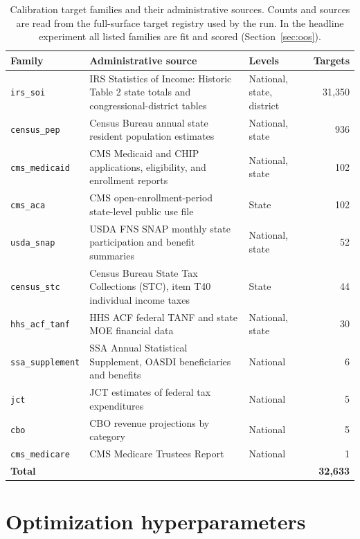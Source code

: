 \begin{table}[H]
\centering
{\tablefont
\begin{tabular}{@{}p{}p{}p{}r@{}}
\toprule
Family & Administrative source & Levels & Targets \\
\midrule
\texttt{irs\_soi} & IRS Statistics of Income: Historic Table 2 state totals and congressional-district tables & National, state, district & 31{,}350 \\
\texttt{census\_pep} & Census Bureau annual state resident population estimates & National, state & 936 \\
\texttt{cms\_medicaid} & CMS Medicaid and CHIP applications, eligibility, and enrollment reports & National, state & 102 \\
\texttt{cms\_aca} & CMS open-enrollment-period state-level public use file & State & 102 \\
\texttt{usda\_snap} & USDA FNS SNAP monthly state participation and benefit summaries & National, state & 52 \\
\texttt{census\_stc} & Census Bureau State Tax Collections (STC), item T40 individual income taxes & State & 44 \\
\texttt{hhs\_acf\_tanf} & HHS ACF federal TANF and state MOE financial data & National, state & 30 \\
\texttt{ssa\_supplement} & SSA Annual Statistical Supplement, OASDI beneficiaries and benefits & National & 6 \\
\texttt{jct} & JCT estimates of federal tax expenditures & National & 5 \\
\texttt{cbo} & CBO revenue projections by category & National & 5 \\
\texttt{cms\_medicare} & CMS Medicare Trustees Report & National & 1 \\
\midrule
\textbf{Total} & & & \textbf{32{,}633} \\
\bottomrule
\end{tabular}
}
\caption{Calibration target families and their administrative sources. Counts and sources are read from
the full-surface target registry used by the run. In the headline experiment all listed families are fit
and scored (Section~\ref{sec:oos}).}
\label{tab:target_sources}
\end{table}

\section{Optimization hyperparameters}
\label{app:hyperparameters}

